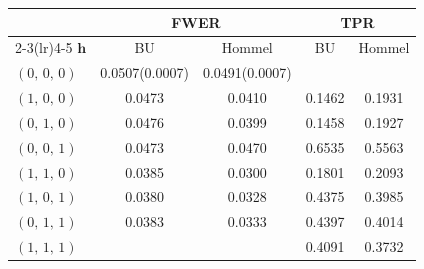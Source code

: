 \begin{tabular}{lcccc}
\toprule
& \multicolumn{2}{c}{FWER} & \multicolumn{2}{c}{TPR} \\
\cmidrule(lr){2-3}\cmidrule(lr){4-5}
$\boldsymbol{h}$ & BU & Hommel & BU & Hommel \\
\midrule
$(0,\,0,\,0)$ & 0.0507(0.0007) & 0.0491(0.0007) &  &  \\
$(1,\,0,\,0)$ & 0.0473 & 0.0410 & 0.1462 & 0.1931 \\
$(0,\,1,\,0)$ & 0.0476 & 0.0399 & 0.1458 & 0.1927 \\
$(0,\,0,\,1)$ & 0.0473 & 0.0470 & 0.6535 & 0.5563 \\
$(1,\,1,\,0)$ & 0.0385 & 0.0300 & 0.1801 & 0.2093 \\
$(1,\,0,\,1)$ & 0.0380 & 0.0328 & 0.4375 & 0.3985 \\
$(0,\,1,\,1)$ & 0.0383 & 0.0333 & 0.4397 & 0.4014 \\
$(1,\,1,\,1)$ &  &  & 0.4091 & 0.3732 \\
\bottomrule
\end{tabular}

